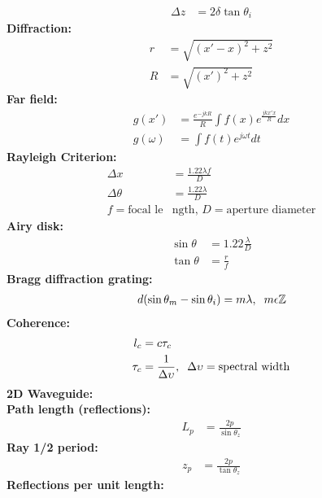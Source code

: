 \documentclass[landscape,a4paper,8pt]{article}
\begin{document}
\begin{multicols}{4}
\begin{align}
		\Delta z &= 2\delta \tan \theta_i
	\end{align}
	\textbf{Diffraction:}\\
	\begin{align}
		r &= \sqrt{(x'-x)^2 + z^2}\\
		R &= \sqrt{(x')^2 + z^2}
	\end{align}
	\hspace*{3mm}\textbf{Far field:}
	\begin{align}
		g(x') &= \frac{e^{-jkR}}{R} \int f(x) e^\frac{jkx'x}{R} dx\\
		g(\omega) &= \int f(t) e^{j\omega t} dt
	\end{align}
	\hspace{3mm}\textbf{Rayleigh Criterion:}
	\begin{align}
		\Delta x &= \frac{1.22 \lambda f}{D}\\
		\Delta \theta &= \frac{1.22 \lambda}{D}\\
		f = \text{focal le}&\text{ngth, } D = \text{aperture diameter} \nonumber
	\end{align}
	\hspace{3mm}\textbf{Airy disk:}
	\begin{align}
		\sin \theta &= 1.22 \frac{\lambda}{D}\\
		\tan \theta &= \frac{r}{f}
	\end{align}
	\hspace{3mm}\textbf{Bragg diffraction grating:}
	\begin{align}
		d(\sin \theta_m - \sin \theta_i) = m \lambda, \hspace{2mm}m \epsilon \mathbb{Z}
	\end{align}
	\textbf{Coherence:}
	\begin{align}
		l_c &= c \tau_c\\
		\tau_c &=  \frac{1}{\Delta \upsilon}, \hspace{2mm} \Delta \upsilon = \text{spectral width}
	\end{align}
	\textbf{2D Waveguide:}\\
	\hspace{3mm}\textbf{Path length (reflections):}
	\begin{align}
		L_p &= \frac{2p}{\sin \theta_z}
	\end{align}
	\hspace{3mm}\textbf{Ray 1/2 period:}
	\begin{align}
		z_p &= \frac{2p}{\tan \theta_z}
	\end{align}
	\hspace{3mm}\textbf{Reflections per unit length:}

\end{multicols}
\end{document}
